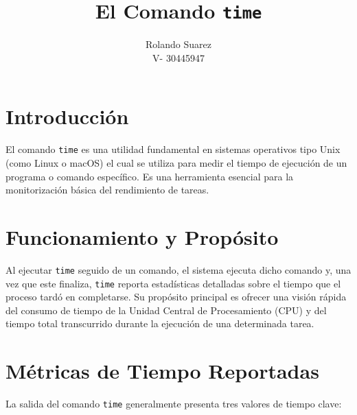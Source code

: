 \documentclass{article}
\title{El Comando \texttt{time}}
\author{Rolando Suarez\\
		V- 30445947}
\date{}
\begin{document}
	
	\maketitle
	
	\section{Introducción}
	El comando \texttt{time} es una utilidad fundamental en sistemas operativos tipo Unix (como Linux o macOS)  el cual se utiliza para medir el tiempo de ejecución de un programa o comando específico. Es una herramienta esencial para la monitorización básica del rendimiento de tareas.
	
	\section{Funcionamiento y Propósito}
	Al ejecutar \texttt{time} seguido de un comando, el sistema ejecuta dicho comando y, una vez que este finaliza, \texttt{time} reporta estadísticas detalladas sobre el tiempo que el proceso tardó en completarse. Su propósito principal es ofrecer una visión rápida del consumo de tiempo de la Unidad Central de Procesamiento (CPU) y del tiempo total transcurrido durante la ejecución de una determinada tarea.
	
	\section{Métricas de Tiempo Reportadas}
	La salida del comando \texttt{time} generalmente presenta tres valores de tiempo clave:
	
\end{document}
